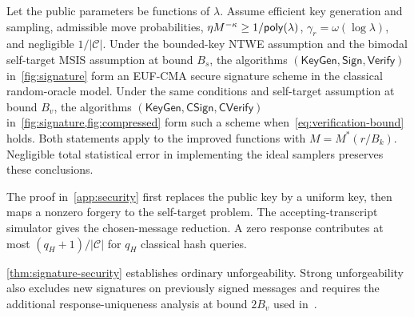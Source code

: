 \begin{theorem}
\label{thm:signature-security}
Let the public parameters be functions of $\lambda$. Assume efficient key generation and sampling, admissible move probabilities, $\eta M^{-\kappa}\ge1/\mathsf{poly}(\lambda)$, $\gamma_r=\omega(\log\lambda)$, and negligible $1/|\mathcal C|$. Under the bounded-key NTWE assumption and the bimodal self-target MSIS assumption at bound $B_s$, the algorithms $(\mathsf{KeyGen},\mathsf{Sign},\mathsf{Verify})$ in~\cref{fig:signature} form an EUF-CMA secure signature scheme in the classical random-oracle model. Under the same conditions and self-target assumption at bound $B_v$, the algorithms $(\mathsf{KeyGen},\mathsf{CSign},\mathsf{CVerify})$ in~\cref{fig:signature,fig:compressed} form such a scheme when~\cref{eq:verification-bound} holds. Both statements apply to the improved functions with $M=M^*(r/B_k)$. Negligible total statistical error in implementing the ideal samplers preserves these conclusions.
\end{theorem}

The proof in~\cref{app:security} first replaces the public key by a uniform key, then maps a nonzero forgery to the self-target problem. The accepting-transcript simulator gives the chosen-message reduction. A zero response contributes at most $(q_H+1)/|\mathcal C|$ for $q_H$ classical hash queries.

\cref{thm:signature-security} establishes ordinary unforgeability. Strong unforgeability also excludes new signatures on previously signed messages and requires the additional response-uniqueness analysis at bound $2B_v$ used in~\cite{GartnerFull}.
\FloatBarrier
